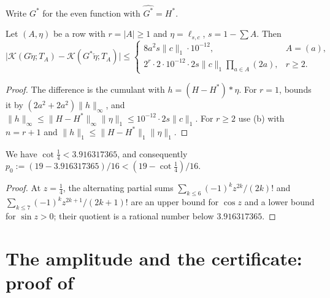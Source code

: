 \documentclass[11pt,colorlinks]{charlie}
\newcommand{\Ka}{\mathcal{K}}
\begin{document}
Write $G^*$ for the even function with $\widehat{G^*}=H^*$.

\begin{lemma}\label{lem:central-error}
Let $(A,\eta)$ be a row with $r=|A|\ge1$ and $\eta=\ell_{s,c}$, $s=1-\sum A$. Then
\[
 \big|\Ka(G\check\eta;T_A)-\Ka(G^*\check\eta;T_A)\big|\le\begin{cases}8a^2s\|c\|_1\cdot10^{-12},&A=(a),\\ 2^{r}\cdot2\cdot10^{-12}\cdot2s\|c\|_1\prod_{a\in A}(2a),&r\ge2.\end{cases}
\]
\end{lemma}
\begin{proof}
The difference is the cumulant with $h=(H-H^*)*\eta$. For $r=1$,  bounds it by $(2a^2+2a^2)\|h\|_\infty$, and $\|h\|_\infty\le\|H-H^*\|_\infty\|\eta\|_1\le10^{-12}\cdot2s\|c\|_1$. For $r\ge2$ use (b) with $n=r+1$ and $\|h\|_1\le\|H-H^*\|_1\|\eta\|_1$.
\end{proof}

\begin{lemma}\label{lem:cot}
We have $\cot\frac14<3.916317365$, and consequently $p_0:=(19-3.916317365)/16<(19-\cot\frac14)/16$.
\end{lemma}
\begin{proof}
At $z=\frac14$, the alternating partial sums $\sum_{k\le6}(-1)^kz^{2k}/(2k)!$ and $\sum_{k\le7}(-1)^kz^{2k+1}/(2k+1)!$ are an upper bound for $\cos z$ and a lower bound for $\sin z>0$; their quotient is a rational number below $3.916317365$.
\end{proof}

\section{The amplitude and the certificate: proof of \texorpdfstring{}{Theorem 1}}\label{sec:certificate}
\end{document}
